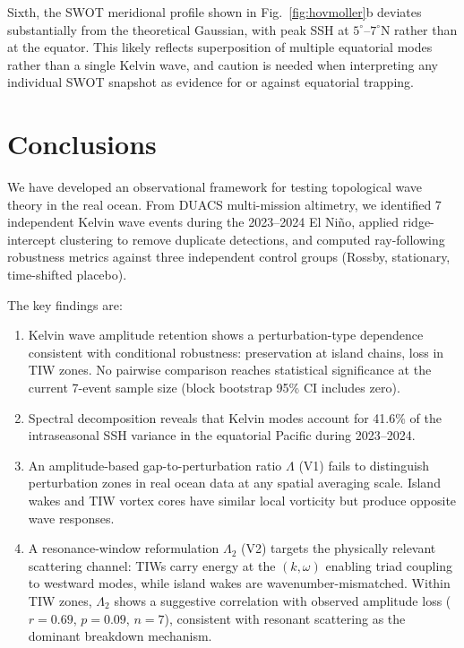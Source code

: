 \documentclass[11pt]{article}
\begin{document}
Sixth, the SWOT meridional profile shown in Fig.~\ref{fig:hovmoller}b deviates substantially from the theoretical Gaussian, with peak SSH at $5^\circ$--$7^\circ$N rather than at the equator. This likely reflects superposition of multiple equatorial modes rather than a single Kelvin wave, and caution is needed when interpreting any individual SWOT snapshot as evidence for or against equatorial trapping.

\section{Conclusions}
\label{sec:conclusions}

We have developed an observational framework for testing topological wave theory in the real ocean. From DUACS multi-mission altimetry, we identified 7 independent Kelvin wave events during the 2023--2024 El Ni\~no, applied ridge-intercept clustering to remove duplicate detections, and computed ray-following robustness metrics against three independent control groups (Rossby, stationary, time-shifted placebo).

The key findings are:
\begin{enumerate}
\item Kelvin wave amplitude retention shows a perturbation-type dependence consistent with conditional robustness: preservation at island chains, loss in TIW zones. No pairwise comparison reaches statistical significance at the current 7-event sample size (block bootstrap 95\% CI includes zero).
\item Spectral decomposition reveals that Kelvin modes account for 41.6\% of the intraseasonal SSH variance in the equatorial Pacific during 2023--2024.
\item An amplitude-based gap-to-perturbation ratio $\Lambda$ (V1) fails to distinguish perturbation zones in real ocean data at any spatial averaging scale. Island wakes and TIW vortex cores have similar local vorticity but produce opposite wave responses.
\item A resonance-window reformulation $\Lambda_2$ (V2) targets the physically relevant scattering channel: TIWs carry energy at the $(k, \omega)$ enabling triad coupling to westward modes, while island wakes are wavenumber-mismatched. Within TIW zones, $\Lambda_2$ shows a suggestive correlation with observed amplitude loss ($r = 0.69$, $p = 0.09$, $n = 7$), consistent with resonant scattering as the dominant breakdown mechanism.
\end{enumerate}
\end{document}
